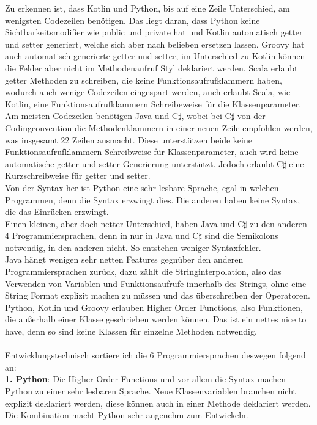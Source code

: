 \documentclass[ngerman]{article}
\begin{document}
    Zu erkennen ist, dass Kotlin und Python, bis auf eine Zeile Unterschied, am wenigsten Codezeilen benötigen. Das liegt daran, dass Python keine Sichtbarkeitsmodifier wie public und private hat und Kotlin automatisch getter und setter generiert, welche sich aber nach belieben ersetzen lassen. Groovy hat auch automatisch generierte getter und setter, im Unterschied zu Kotlin können die Felder aber nicht im Methodenaufruf Styl deklariert werden. Scala erlaubt getter Methoden zu schreiben, die keine Funktionsaufrufklammern haben, wodurch auch wenige Codezeilen eingespart werden, auch erlaubt Scala, wie Kotlin, eine Funktionsaufrufklammern Schreibeweise für die Klassenparameter. Am meisten Codezeilen benötigen Java und C$\sharp$, wobei bei C$\sharp$ von der Codingconvention die Methodenklammern in einer neuen Zeile empfohlen werden, was insgesamt 22 Zeilen ausmacht. Diese unterstützen beide keine Funktionsaufrufklammern Schreibweise für Klassenparameter, auch wird keine automatische getter und setter Generierung unterstützt. Jedoch erlaubt C$\sharp$ eine Kurzschreibweise für getter und setter.\\
    Von der Syntax her ist Python eine sehr lesbare Sprache, egal in welchen Programmen, denn die Syntax erzwingt dies. Die anderen haben keine Syntax, die das Einrücken erzwingt.\\
    Einen kleinen, aber doch netter Unterschied, haben Java und C$\sharp$ zu den anderen 4 Programmiersprachen, denn in nur in Java und C$\sharp$ sind die Semikolons notwendig, in den anderen nicht. So entstehen weniger Syntaxfehler.\\
    Java hängt wenigen sehr netten Features gegnüber den anderen Programmiersprachen zurück, dazu zählt die Stringinterpolation, also das Verwenden von Variablen und Funktionsaufrufe innerhalb des Strings, ohne eine String Format explizit machen zu müssen und das überschreiben der Operatoren.\\
    Python, Kotlin und Groovy erlauben Higher Order Functions, also Funktionen, die außerhalb einer Klasse geschrieben werden können. Das ist ein nettes nice to have, denn so sind keine Klassen für einzelne Methoden notwendig.\\\\
    Entwicklungstechnisch sortiere ich die 6 Programmiersprachen deswegen folgend an:\\
    \textbf{1. Python}: Die Higher Order Functions und vor allem die Syntax machen Python zu einer sehr lesbaren Sprache. Neue Klassenvariablen brauchen nicht explizit deklariert werden, diese können auch in einer Methode deklariert werden. Die Kombination macht Python sehr angenehm zum Entwickeln.\\
\end{document}

